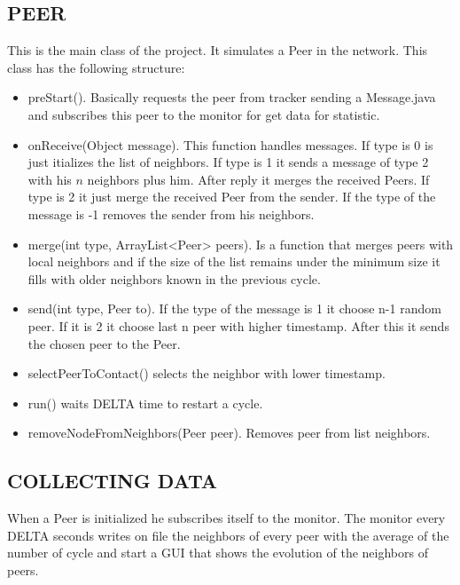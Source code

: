 \documentclass[a4paper,12pt,notitlepage]{article} %
\begin{document}
\subsection{PEER}
	This is the main class of the project. It simulates a Peer in the network. This class has the following structure:  
\begin{itemize}
\item preStart(). Basically requests the peer from tracker sending a Message.java and subscribes this peer to the monitor 
 for get data for statistic.
\item onReceive(Object message). This function handles messages. If type is 0 is just  itializes the list of neighbors. If 
type is 1 it sends a message of type 2 with his \(n\) neighbors plus him. After reply it merges the 
received Peers. If type is 2 it just merge the received Peer from the sender. If the type of the message is -1  removes the 
sender from his neighbors.
\item merge(int type, ArrayList<Peer> peers). Is a function that merges peers with local neighbors and if the size of the 
list remains under the minimum size it fills with older neighbors known in the previous cycle.
\item send(int type, Peer to). If the type of the message is 1 it choose n-1 random peer. If it is 2 it choose last n peer 
with higher timestamp. After this it sends the chosen peer to the Peer.
\item selectPeerToContact() selects the neighbor with lower timestamp.
\item run() waits DELTA time to restart a cycle.
\item removeNodeFromNeighbors(Peer peer). Removes peer from list neighbors.

\end{itemize}

\subsection{COLLECTING DATA}
	When a Peer is initialized he subscribes itself to the monitor. The monitor every DELTA seconds writes on file the 
neighbors of every peer with the average of the  number of cycle and start a GUI that shows the evolution of the 
neighbors of peers.
\end{document}
